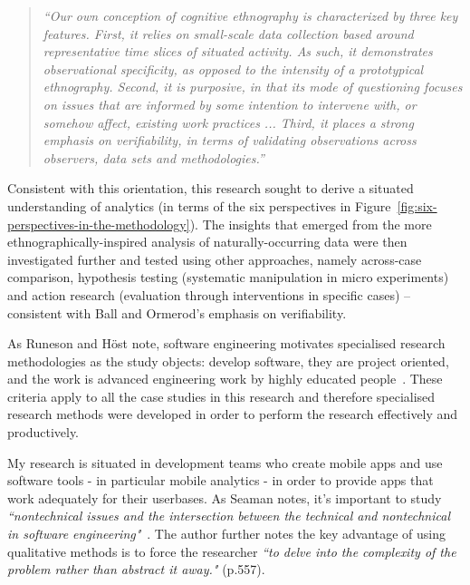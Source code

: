 \begin{quote}
  \textit{``Our own conception of cognitive ethnography is characterized by three key features. First, it relies on small-scale data collection based around representative time slices of situated activity. As such, it demonstrates observational specificity, as opposed to the intensity of a prototypical ethnography. Second, it is purposive, in that its mode of questioning focuses on issues that are informed by some intention to intervene with, or somehow affect, existing work practices ... Third, it places a strong emphasis on verifiability, in terms of validating observations across observers, data sets and methodologies.''}   ~\citep[p.152]{ball2000_putting_ethnography_to_work_cognitive_ethnography} 
\end{quote} %

Consistent with this orientation, this research sought to derive a situated understanding of analytics (in terms of the six perspectives in Figure~\ref{fig:six-perspectives-in-the-methodology}). The insights that emerged from the more ethnographically-inspired analysis of naturally-occurring data were then investigated further and tested using other approaches, namely across-case comparison, hypothesis testing (systematic manipulation in micro experiments) and action research (evaluation through interventions in specific cases) -- consistent with Ball and Ormerod's emphasis on verifiability.  

As Runeson and Höst note, software engineering motivates specialised research methodologies as the study objects: develop software, they are project oriented, and the work is advanced engineering work by highly educated people~\citep[pp. 132-133]{runeson_2008_guidelines_for_conducting_and_reporting_case_study_research_in_sw_eng}. %
These criteria apply to all the case studies in this research and therefore specialised research methods were developed in order to perform the research effectively and productively. 

My research is situated in development teams who create mobile apps and use software tools - in particular mobile analytics - in order to provide apps that work adequately for their userbases. As Seaman notes, it's important to study \emph{``nontechnical issues and the intersection between the technical and nontechnical in software engineering"}~\citep[p.557]{seaman1999_qualitative_methods_in_esse}. The author further notes the key advantage of using qualitative methods is to force the researcher \emph{``to delve into the complexity of the problem rather than abstract it away."} (p.557).

